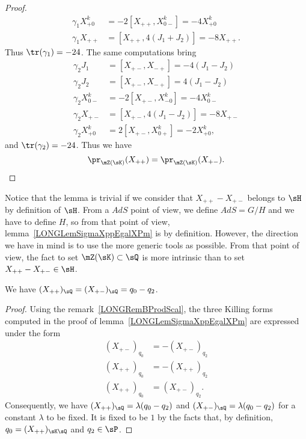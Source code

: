 \begin{proof}
\begin{subequations}
\begin{align}
			\gamma_1X^k_{+0} & =-2[X_{++},X^k_{0-}]=-4X^k_{+0} \\
			\gamma_1X_{++}   & =[X_{++},4(J_1+J_2)]=-8X_{++}.
		\end{align}
	\end{subequations}
	Thus $\tr(\gamma_1)=-24$. The same computations bring
	\begin{subequations}
		\begin{align}
			\gamma_2J_1      & =[X_{+-},X_{-+}]=-4(J_1-J_2)    \\
			\gamma_2J_2      & =[X_{+-},X_{-+}]=4(J_1-J_2)     \\
			\gamma_2X^k_{0-} & =-2[X_{+-},X^k_{-0}]=-4X^k_{0-} \\
			\gamma_2X_{+-}   & =[X_{+-},4(J_1-J_2)]=-8X_{+-}   \\
			\gamma_2X^k_{+0} & =2[X_{+-},X^k_{0+}]=-2X^k_{+0},
		\end{align}
	\end{subequations}
	and $\tr(\gamma_2)=-24$. Thus we have
	\begin{equation}
		\pr_{\mZ(\sK)}(X_{++})=\pr_{\mZ(\sK)}(X_{+-}).
	\end{equation}
\end{proof}

Notice that the lemma is trivial if we consider that $X_{++}-X_{+-}$ belongs to $\sH$ by definition of $\sH$. From a $AdS$ point of view, we define $AdS=G/H$ and we have to define $H$, so from that point of view, lemma~\ref{LONGLemSigmaXppEgalXPm} is by definition. However, the direction we have in mind is to use the more generic tools as possible. From that point of view, the fact to set $\mZ(\sK)\subset\sQ$ is more intrinsic than to set $X_{++}-X_{+-}\in\sH$.


\begin{proposition}		\label{LONGPropXmpXppqq}
	We have $(X_{++})_{\sQ}=(X_{+-})_{\sQ}=q_0-q_2$.
\end{proposition}

\begin{proof}
	Using the remark~\ref{LONGRemBProdScal}, the three Killing forms computed in the proof of lemma~\ref{LONGLemSigmaXppEgalXPm} are expressed under the form
	\begin{subequations}
		\begin{align}
			(X_{+-})_{q_0} & =-(X_{+-})_{q_2} \\
			(X_{++})_{q_0} & =-(X_{++})_{q_2} \\
			(X_{++})_{q_0} & =(X_{+-})_{q_2}.
		\end{align}
	\end{subequations}
	Consequently, we have $(X_{++})_{\sQ}=\lambda(q_0-q_2)$ and $(X_{+-})_{\sQ}=\lambda(q_0-q_2)$ for a constant $\lambda$ to be fixed. It is fixed to be $1$ by the facts that, by definition, $q_0=(X_{++})_{\sK\sQ}$ and $q_2\in\sP$.
\end{proof}

